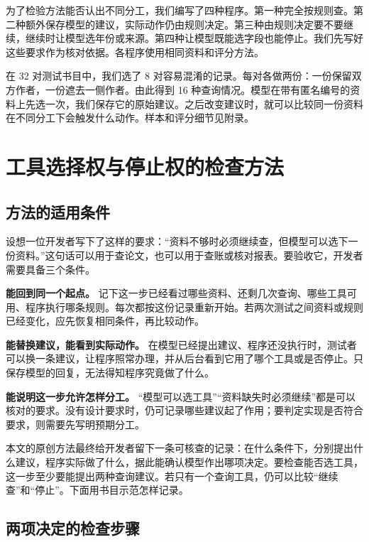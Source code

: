 \documentclass[UTF8,12pt,a4paper,fontset=none]{ctexart}
\begin{document}
为了检验方法能否认出不同分工，我们编写了四种程序。第一种完全按规则查。第二种额外保存模型的建议，实际动作仍由规则决定。第三种由规则决定要不要继续，继续时让模型选年份或来源。第四种让模型既能选字段也能停止。我们先写好这些要求作为核对依据。各程序使用相同资料和评分方法。\par

在 32 对测试书目中，我们选了 8 对容易混淆的记录。每对各做两份：一份保留双方作者，一份遮去一侧作者。由此得到 16 种查询情况。模型在带有匿名编号的资料上先选一次，我们保存它的原始建议。之后改变建议时，就可以比较同一份资料在不同分工下会触发什么动作。样本和评分细节见附录。\par

\section{工具选择权与停止权的检查方法}

\subsection{方法的适用条件}

设想一位开发者写下了这样的要求：“资料不够时必须继续查，但模型可以选下一份资料。”这句话可以用于查论文，也可以用于查账或核对报表。要验收它，开发者需要具备三个条件。\par

\textbf{能回到同一个起点。} 记下这一步已经看过哪些资料、还剩几次查询、哪些工具可用、程序执行哪条规则。每次都按这份记录重新开始。若两次测试之间资料或规则已经变化，应先恢复相同条件，再比较动作。\par

\textbf{能替换建议，能看到实际动作。} 在模型已经提出建议、程序还没执行时，测试者可以换一条建议，让程序照常办理，并从后台看到它用了哪个工具或是否停止。只保存模型的回复，无法得知程序究竟做了什么。\par

\textbf{能说明这一步允许怎样分工。} “模型可以选工具”“资料缺失时必须继续”都是可以核对的要求。没有设计要求时，仍可记录哪些建议起了作用；要判定实现是否符合要求，则需要先写明预期分工。\par

本文的原创方法最终给开发者留下一条可核查的记录：在什么条件下，分别提出什么建议，程序实际做了什么，据此能确认模型作出哪项决定。要检查能否选工具，这一步至少要能提出两种查询建议。若只有一个查询工具，仍可以比较“继续查”和“停止”。下面用书目示范怎样记录。\par

\subsection{两项决定的检查步骤}
\end{document}
